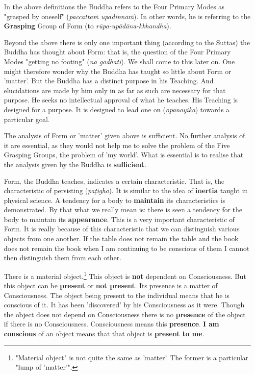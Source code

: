 In the above definitions the Buddha refers to the Four Primary Modes as "grasped by oneself" (\emph{paccattaṁ upādinnaṁ}). In other words, he is referring to the \textbf{Grasping} Group of Form (to \emph{rūpa-upādāna-kkhandha}).

Beyond the above there is only one important thing (according to the Suttas) the Buddha has thought about Form: that is, the question of the Four Primary Modes "getting no footing" (\emph{na gādhati}). We shall come to this later on. One might therefore wonder why the Buddha has taught so little about Form or 'matter'. But the Buddha has a distinct purpose in his Teaching. And elucidations are made by him only in as far as such are necessary for that purpose. He seeks no intellectual approval of what he teaches. His Teaching is designed for a purpose. It is designed to lead one on (\emph{opanayika}) towards a particular goal.

The analysis of Form or 'matter' given above is sufficient. No further analysis of it are essential, as they would not help me to solve the problem of the Five Grasping Groups, the problem of 'my world'. What is essential is to realise that the analysis given by the Buddha is \textbf{sufficient}.

Form, the Buddha teaches, indicates a certain characteristic. That is, the characteristic of persisting (\emph{paṭigha}). It is similar to the idea of \textbf{inertia} taught in physical science. A tendency for a body to \textbf{maintain} its characteristics is demonstrated. By that what we really mean is: there is seen a tendency for the body to maintain its \textbf{appearance}. This is a very important characteristic of Form. It is really because of this characteristic that we can distinguish various objects from one another. If the table does not remain the table and the book does not remain the book when I am continuing to be conscious of them I cannot then distinguish them from each other.

There is a material object.\footnote{"Material object" is not quite the same as 'matter'. The former is a particular "lump of 'matter'".} This object is \textbf{not} dependent on Consciousness. But this object can be \textbf{present} or \textbf{not present}. Its presence is a matter of Consciousness. The object being present to the individual means that he is conscious of it. It has been 'discovered' by his Consciousness as it were. Though the object does not depend on Consciousness there is no \textbf{presence} of the object if there is no Consciousness. Consciousness means this \textbf{presence}. \textbf{I am conscious} of an object means that that object is \textbf{present to me}.

